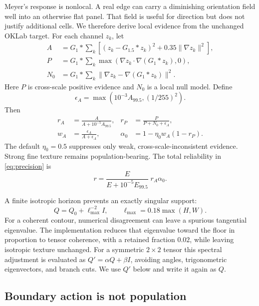 \documentclass[11pt,letterpaper]{article}
\begin{document}
Meyer's response is nonlocal. A real edge can carry a diminishing orientation field
well into an otherwise flat panel. That field is useful for direction but does not
justify additional cells. We therefore derive local evidence from the unchanged OKLab
target. For each channel \(z_k\), let
\begin{align}
A &= G_1*\sum_k\left[(z_k-G_{1.5}*z_k)^2
        +0.35\|\nabla z_k\|^2\right], \\
P &= G_1*\sum_k\max\left(\nabla z_k\cdot\nabla(G_1*z_k),0\right),\\
N_0 &= G_1*\sum_k\|\nabla z_k-\nabla(G_1*z_k)\|^2.
\end{align}
Here \(P\) is cross-scale positive evidence and \(N_0\) is a local null model. Define
\begin{equation}
\epsilon_A=\max\left(10^{-3}A_{99.5},(1/255)^2\right).
\end{equation}
Then
\begin{align}
r_A &= \frac{A}{A+10^{-5}A_{99.5}},&
r_P &= \frac{P}{P+N_0+\epsilon_A},\\
w_A &= \frac{\epsilon_A}{A+\epsilon_A},&
\alpha_0 &= 1-\eta_0 w_A(1-r_P).
\end{align}
The default \(\eta_0=0.5\) suppresses only weak, cross-scale-inconsistent evidence.
Strong fine texture remains population-bearing. The total reliability in
\cref{eq:precision} is
\begin{equation}
r=\frac{E}{E+10^{-5}E_{99.5}}\;r_A\alpha_0.
\end{equation}

A finite isotropic horizon prevents an exactly singular support:
\begin{equation}
Q=Q_0+\ell_{\max}^{-2}I,\qquad
\ell_{\max}=0.18\max(H,W).
\label{eq:floor}
\end{equation}
For a coherent contour, numerical disagreement can leave a spurious tangential
eigenvalue. The implementation reduces that eigenvalue toward the floor in proportion
to tensor coherence, with a retained fraction \(0.02\), while leaving isotropic texture
unchanged. For a symmetric \(2\times2\) tensor this spectral adjustment is evaluated as
\(Q'=\alpha Q+\beta I\), avoiding angles, trigonometric eigenvectors, and branch cuts.
We use \(Q'\) below and write it again as \(Q\).

\subsection{Boundary action is not population}
\end{document}
